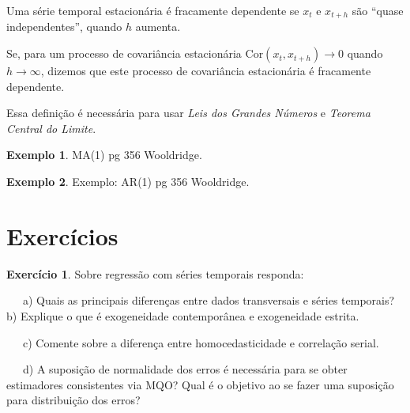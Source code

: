 \documentclass[
]{book}
\theoremstyle{definition}
\theoremstyle{definition}
\newtheorem{example}{Exemplo}[chapter]
\theoremstyle{definition}
\newtheorem{exercise}{Exercício}[chapter]
\theoremstyle{remark}
\begin{document}
Uma série temporal estacionária é fracamente dependente se \(x_t\) e \(x_{t + h}\) são
``quase independentes'', quando \(h\) aumenta.

Se, para um processo de covariância estacionária \(\mbox{Cor}(x_t, x_{t + h})\rightarrow 0\) quando \(h\rightarrow \infty\), dizemos que este processo de covariância estacionária é fracamente dependente.

Essa definição é necessária para usar \emph{Leis dos Grandes Números} e \emph{Teorema Central do Limite}.

\begin{example}
\protect\hypertarget{exm:Wpg365}{}{\label{exm:Wpg365} }MA(1) pg 356 Wooldridge.
\end{example}

\begin{example}
\protect\hypertarget{exm:Wpg366}{}{\label{exm:Wpg366} }Exemplo: AR(1) pg 356 Wooldridge.
\end{example}

\newpage

\hypertarget{exercuxedcios}{%
\section{Exercícios}\label{exercuxedcios}}

\begin{exercise}
\protect\hypertarget{exr:exsr1}{}{\label{exr:exsr1} }Sobre regressão com séries temporais responda:

~~~a) Quais as principais diferenças entre dados transversais e séries temporais?\\
\hspace*{0.333em}\hspace*{0.333em}\hspace*{0.333em}b) Explique o que é exogeneidade contemporânea e exogeneidade estrita.

~~~c) Comente sobre a diferença entre homocedasticidade e correlação serial.

~~~d) A suposição de normalidade dos erros é necessária para se obter estimadores consistentes via MQO? Qual é o objetivo ao se fazer uma suposição para distribuição dos erros?
\end{exercise}
\end{document}
